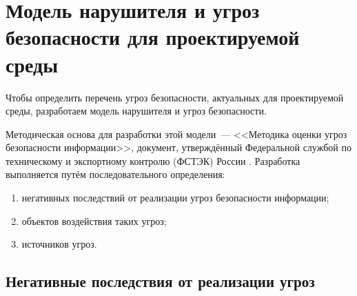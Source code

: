 

\section{Модель нарушителя и угроз безопасности для проектируемой среды}

Чтобы определить перечень угроз безопасности, актуальных для проектируемой среды, разработаем модель нарушителя и угроз безопасности.

Методическая основа для разработки этой модели~--- <<Методика оценки угроз безопасности информации>>, документ, утверждённый Федеральной службой по техническому и экспортному контролю (ФСТЭК) России \cite{FSTECmethod}. Разработка выполняется путём последовательного определения:


\begin{enumerate}
\item негативных последствий от реализации угроз безопасности информации;
\item объектов воздействия таких угроз;
\item источников угроз.
\end{enumerate}

\subsection{Негативные последствия от реализации угроз}


